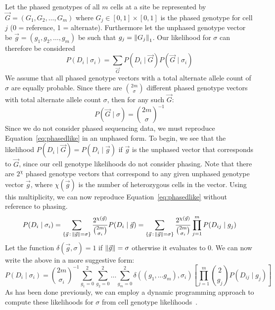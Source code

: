 \documentclass[../../main.tex]{subfiles}
\begin{document}
Let the phased genotypes of all $m$ cells at a site be represented by $\vec{G} = (G_1,G_2,\dots,G_m)$ where $G_j\in [0,1]\times[0,1]$ is the phased genotype for cell $j$ (0 = reference, 1 = alternate).
Furthermore let the unphased genotype vector be $\vec{g} = (g_1,g_2,\dots,g_m)$ be such that $g_j = \left\lVert G_j\right\rVert_1$.
Our likelihood for $\sigma$ can therefore be considered
\begin{equation} \label{eq:phasedlike}
P(D_i\mid\sigma_i) = \sum_{\vec{G}} P(D_i \mid \vec{G}) P(\vec{G} \mid \sigma_i)
\end{equation}
We assume that all phased genotype vectors with a total alternate allele count of $\sigma$ are equally probable.
Since there are $\binom{2m}{\sigma}$ different phased genotype vectors with total alternate allele count $\sigma$, then for any such $\vec{G}$:
\begin{equation*}
P(\vec{G}\mid \sigma) = \binom{2m}{\sigma}^{-1}
\end{equation*}
Since we do not consider phased sequencing data, we must reproduce Equation~\eqref{eq:phasedlike} in an unphased form.
To begin, we see that the likelihood $P(D_i\mid \vec{G}) = P(D_i\mid \vec{g})$ if $\vec{g}$ is the unphased vector that corresponds to $\vec{G}$, since our cell genotype likelihoods do not consider phasing.
Note that there are $2^\chi$ phased genotype vectors that correspond to any given unphased genotype vector $\vec{g}$, where $\chi(\vec{g})$ is the number of heterozygous cells in the vector.
Using this multiplicity, we can now reproduce Equation~\eqref{eq:phasedlike} without reference to phasing.
\begin{equation*}
P(D_i\mid\sigma_i) = \sum_{\{\vec{g}\, : \, \left\lVert\vec{g}\right\rVert=\sigma \}} \frac{2^{\chi(\vec{g})}}{\binom{2m}{\sigma_i}} P(D_i\mid\vec{g}) = \sum_{\{\vec{g}\, : \, \left\lVert\vec{g}\right\rVert=\sigma \}} \frac{2^{\chi(\vec{g})}}{\binom{2m}{\sigma_i}} \prod_{j=1}^{m}P(D_{ij}\mid g_{j})
\end{equation*}
Let the function $\delta(\vec{g},\sigma) = 1$ if $\left\lVert\vec{g}\right\rVert=\sigma$ otherwise it evaluates to 0.
We can now write the above in a more suggestive form:
\begin{equation}\label{eq:sitelikelihood}
P(D_i\mid\sigma_i) = \binom{2m}{\sigma_i}^{-1}\sum_{g_1=0}^2\sum_{g_2=0}^2\dots\sum_{g_m=0}^2 \delta((g_1,\dots g_m),\sigma_i)\left[\prod_{j=1}^{m}\binom{2}{g_j}P(D_{ij}\mid g_{j})\right]
\end{equation}
As has been done previously, we can employ a dynamic programming approach to compute these likelihoods for $\sigma$ from cell genotype likelihoods~\cite{monovar, sciphi, ledurbin}.
\end{document}
